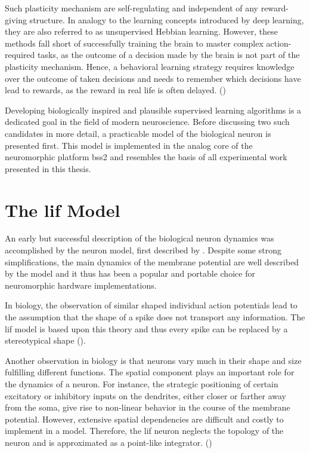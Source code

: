 Such plasticity mechanism are self-regulating and independent of any reward-giving structure. In analogy to the learning concepts introduced by deep learning, they are also referred to as unsupervised Hebbian learning. However, these methods fall short of successfully training the brain to master complex action-required tasks, as the outcome of a decision made by the brain is not part of the plasticity mechanism. Hence, a behavioral learning strategy requires knowledge over the outcome of taken decisions and needs to remember which decisions have lead to rewards, as the reward in real life is often delayed. (\citealp{gerstner2014dynamics})

Developing biologically inspired and plausible supervised learning algorithms is a dedicated goal in the field of modern neuroscience. Before discussing two such candidates in more detail, a practicable model of the biological neuron is presented first. This model is implemented in the analog core of the neuromorphic platform \gls{bss2} and resembles the basis of all experimental work presented in this thesis.

\section{The \acrlong{lif} Model}

An early but successful description of the biological neuron dynamics was accomplished by the  neuron model, first described by \citealp{lapicque1907recherches}. Despite some strong simplifications, the main dynamics of the membrane potential are well described by the model and it thus has been a popular and portable choice for neuromorphic hardware implementations.

In biology, the observation of similar shaped individual action potentials lead to the assumption that the shape of a spike does not transport any information. The \gls{lif} model is based upon this theory and thus every spike can be replaced by a stereotypical shape (\citealp{gerstner2014dynamics}). 

Another observation in biology is that neurons vary much in their shape and size fulfilling different functions. The spatial component plays an important role for the dynamics of a neuron. For instance, the strategic positioning of certain excitatory or inhibitory inputs on the dendrites, either closer or farther away from the soma, give rise to non-linear behavior in the course of the membrane potential. However, extensive spatial dependencies are difficult and costly to implement in a model. Therefore, the \gls{lif} neuron neglects the topology of the neuron and is approximated as a point-like integrator. (\citealp{gerstner2014dynamics})

